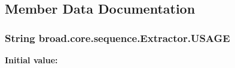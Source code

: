 \subsection{Member Data Documentation}
\hypertarget{classbroad_1_1core_1_1sequence_1_1_extractor_a03bf9a27c15f1d3eb2dff12d4847be02}{
\subsubsection[{U\+S\+A\+G\+E}]{\setlength{\rightskip}{0pt plus 5cm}String broad.\+core.\+sequence.\+Extractor.\+U\+S\+A\+G\+E\hspace{0.3cm}{\ttfamily [static]}}}\label{classbroad_1_1core_1_1sequence_1_1_extractor_a03bf9a27c15f1d3eb2dff12d4847be02}
{\bfseries Initial value\+:}
